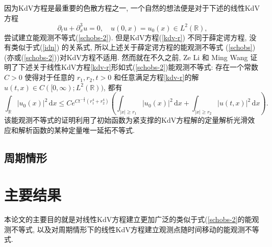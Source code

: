 \documentclass[master]{cugthesis}
\newcommand\R{\ensuremath{\mathbb{R}}}
\renewcommand\d{\ensuremath{\,\mathrm{d}}}
\begin{document}
    因为KdV方程是最重要的色散方程之一, 一个自然的想法便是对于下述的线性KdV方程
    \begin{equation}
        \partial_t u+\partial_x^3 u=0,\quad u(0,x)=u_0(x)\in L^2(\R),\label{kdv-r}
    \end{equation} 
    尝试建立能观测不等式(\ref{schobs-2}). 但是KdV方程(\ref{kdv-r}) 不同于薛定谔方程, 没有类似于式(\ref{idn}) 的关系式, 所以上述关于薛定谔方程的能观测不等式 (\ref{schobs}) (亦或(\ref{schobs-2}))对KdV方程不适用. 然而就在不久之前, Ze Li 和 Ming Wang 证明了下述关于线性KdV方程\ref{kdv-r}形如式(\ref{schobs-2})能观测不等式: 存在一个常数 $C>0$ 使得对于任意的 $r_1,r_2,t>0$ 和任意满足方程\ref{kdv-r}的解 $u(t,x)\in C([0,\infty);L^2(\R))$, 都有
    \begin{equation}
        \int_{\R}|u_0(x)|^2\d x\le Ce^{Ct^{-\frac{4}{3}}\left(r_1^4+r_2^4\right)}\left(\int
        _{|x|\ge r_1}|u_0(x)|^2\d x+\int _{|x|\ge r_2}|u(t,x)|^2\d x\right).\label{kdvobs-1}
    \end{equation}
    该能观测不等式的证明利用了初始函数为紧支撑的KdV方程解的定量解析光滑效应和解析函数的某种定量唯一延拓不等式.
    \subsection{周期情形}
    
    
    \section{主要结果}
    本论文的主要目的就是对线性KdV方程建立更加广泛的类似于式(\ref{schobs-2}的能观测不等式, 以及对周期情形下的线性KdV方程建立观测点随时间移动的能观测不等式.
    
\end{document}
